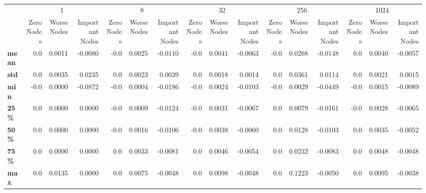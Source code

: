 \begin{tabular}{lrrrrrrrrrrrrrrr}
\toprule
{} & \multicolumn{3}{c}{1} & \multicolumn{3}{c}{8} & \multicolumn{3}{c}{32} & \multicolumn{3}{c}{256} & \multicolumn{3}{c}{1024} \\
{} & Zero Nodes & Worse Nodes & Important Nodes & Zero Nodes & Worse Nodes & Important Nodes & Zero Nodes & Worse Nodes & Important Nodes & Zero Nodes & Worse Nodes & Important Nodes & Zero Nodes & Worse Nodes & Important Nodes \\
\midrule
\textbf{mean} &        0.0 &      0.0011 &         -0.0080 &       -0.0 &      0.0025 &         -0.0110 &       -0.0 &      0.0041 &         -0.0063 &       -0.0 &      0.0268 &         -0.0148 &        0.0 &      0.0040 &         -0.0057 \\
\textbf{std } &        0.0 &      0.0035 &          0.0235 &        0.0 &      0.0023 &          0.0039 &        0.0 &      0.0018 &          0.0014 &        0.0 &      0.0361 &          0.0114 &        0.0 &      0.0021 &          0.0015 \\
\textbf{min } &       -0.0 &      0.0000 &         -0.0872 &       -0.0 &      0.0004 &         -0.0186 &       -0.0 &      0.0024 &         -0.0103 &       -0.0 &      0.0029 &         -0.0449 &       -0.0 &      0.0015 &         -0.0089 \\
\textbf{25\% } &        0.0 &      0.0000 &          0.0000 &       -0.0 &      0.0009 &         -0.0124 &       -0.0 &      0.0031 &         -0.0067 &        0.0 &      0.0079 &         -0.0161 &       -0.0 &      0.0028 &         -0.0065 \\
\textbf{50\% } &        0.0 &      0.0000 &          0.0000 &       -0.0 &      0.0016 &         -0.0106 &       -0.0 &      0.0038 &         -0.0060 &        0.0 &      0.0128 &         -0.0103 &        0.0 &      0.0035 &         -0.0052 \\
\textbf{75\% } &        0.0 &      0.0000 &          0.0000 &        0.0 &      0.0033 &         -0.0081 &        0.0 &      0.0046 &         -0.0054 &        0.0 &      0.0232 &         -0.0083 &        0.0 &      0.0048 &         -0.0048 \\
\textbf{max } &        0.0 &      0.0135 &          0.0000 &        0.0 &      0.0075 &         -0.0048 &        0.0 &      0.0098 &         -0.0048 &        0.0 &      0.1223 &         -0.0050 &        0.0 &      0.0095 &         -0.0038 \\
\bottomrule
\end{tabular}

